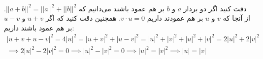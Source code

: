 \\
دقت کنید اگر دو بردار
$a$ و $b$
بر هم عمود باشند می‌دانیم که
$||a + b||^2 = ||a||^2 + ||b||^2$.
از آنجا که
$v$ و $u$
بر هم عمودند داریم
$v \cdot u = 0$.
همچنین دقت کنید که اگر
$u + v$ و $u - v$
بر هم عمود باشند داریم:
\begin{gather*}
    |u + v + u - v|^2 = 4|u|^2 = |u + v|^2 + |u - v|^2 = |u|^2 + |v|^2 + |u|^2 + |v|^2 = 2|u|^2 + 2|v|^2\\
    \implies 2|u|^2 - 2|v|^2 = 0 \implies |u|^2 - |v|^2 = 0 \implies |u|^2 = |v|^2 \implies |u| = |v|
\end{gather*}